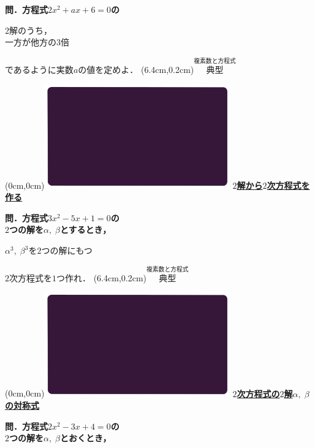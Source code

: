 \documentclass[10pt,
fleqn,
dvipdfmx,
uplatex
]{jsarticle}
\begin{document}
\large 
\bf\boldmath 問．方程式$2x^2+ax+6=0$の

\huge
$2$解のうち，\\
\hfill 一方が他方の$3$倍\vspace{0.3zw}

\large 
\hfill 
であるように実数$a$の値を定めよ．
\at(6.4cm,0.2cm){\small\color{bradorange}$\overset{\text{複素数と方程式}}{\text{典型}}$}

\newpage

\at(0cm,0cm){\includegraphics[width=8cm,bb=0 0 1920 1080]{./youtube/thumbnails/templates/smart_background/複素数と方程式.jpeg}}
{\color{orange}\bf\boldmath\Large\underline{$2$解から$2$次方程式を作る}}\vspace{0.3zw}

\Large 
\bf\boldmath 問．方程式$3x^2-5x+1=0$の\\
$2$つの解を$\alpha ,\;\beta$とするとき，

\LARGE
\hspace{0.7zw}$\alpha ^3,\;\beta ^3$を$2$つの解にもつ

\Large
\hfill $2$次方程式を$1$つ作れ．
\at(6.4cm,0.2cm){\small\color{bradorange}$\overset{\text{複素数と方程式}}{\text{典型}}$}

\newpage

\at(0cm,0cm){\includegraphics[width=8cm,bb=0 0 1920 1080]{./youtube/thumbnails/templates/smart_background/複素数と方程式.jpeg}}
{\color{orange}\bf\boldmath\large\underline{$2$次方程式の$2$解$\alpha ,\;\beta$の対称式}}\vspace{0.3zw}

\Large 
\bf\boldmath 問．方程式$2x^2-3x+4=0$の\\
$2$つの解を$\alpha ,\;\beta$とおくとき，
\end{document}
